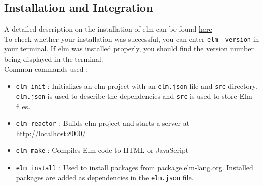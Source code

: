 \cleardoublepage
\begin{FlushLeft}
\subsection{Installation and Integration}
A detailed description on the installation of elm can be found \href{https://guide.elm-lang.org/install/elm.html}{here}\\[0.1in]
To check whether your installation was successful, you can enter \texttt{elm --version} in your terminal. If elm was installed properly, you should find the version number being displayed in the terminal.\\[0.1in]
Common commands used :\\[0.1in]
\begin{itemize}
    \item \texttt{elm init} : Initializes an elm project with an \texttt{elm.json} file and \texttt{src} directory. \texttt{elm.json} is used to describe the dependencies and \texttt{src} is used to store Elm files.
    \item \texttt{elm reactor} : Builds elm project and starts a server at \href{http://localhost:8000/}{http://localhost:8000/}
    \item \texttt{elm make} : Compiles Elm code to HTML or JavaScript 
    \item \texttt{elm install} : Used to install packages from \href{https://package.elm-lang.org/}{package.elm-lang.org}. Installed packages are added as dependencies in the \texttt{elm.json} file.
\end{itemize}
\end{FlushLeft}